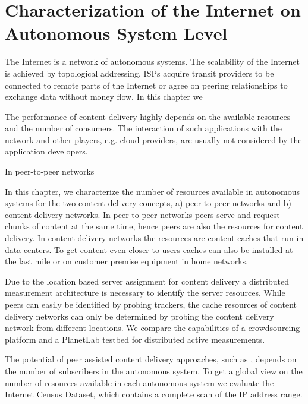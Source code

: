\chapter{Characterization of the Internet on Autonomous System Level}\label{chap:aslevel}

The Internet is a network of autonomous systems.
The scalability of the Internet is achieved by topological addressing.
ISPs acquire transit providers to be connected to remote parts of the Internet or agree on peering relationships to exchange data without money flow.
In this chapter we

The performance of content delivery highly depends on the available resources and the number of consumers.
The interaction of such applications with the network and other players, e.g. cloud providers, are usually not considered by the application developers.

In peer-to-peer networks

In this chapter, we characterize the number of resources available in autonomous systems for the two content delivery concepts, a) peer-to-peer networks and b) content delivery networks.
In peer-to-peer networks peers serve and request chunks of content at the same time, hence peers are also the resources for content delivery.
In content delivery networks the resources are content caches that run in data centers. To get content even closer to users caches can also be installed at the last mile or on customer premise equipment in home networks.

Due to the location based server assignment for content delivery a distributed measurement architecture is necessary to identify the server resources.
While peers can easily be identified by probing trackers, the cache resources of content delivery networks can only be determined by probing the content delivery network from different locations.
We compare the capabilities of a crowdsourcing platform and a PlanetLab testbed for distributed active measurements.

The potential of peer assisted content delivery approaches, such as \cite{HORST}, depends on the number of subscribers in the autonomous system.
To get a global view on the number of resources available in each autonomous system we evaluate the Internet Census Dataset, which contains a complete scan of the IP address range.

